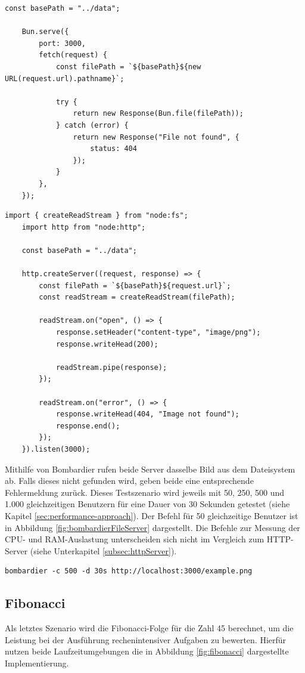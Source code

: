 \begin{lstlisting}[caption={Datei-Server Bun},label={fig:fileServerBun}]
	const basePath = "../data";
	
	Bun.serve({
		port: 3000,
		fetch(request) {
			const filePath = `${basePath}${new URL(request.url).pathname}`;
			
			try {
				return new Response(Bun.file(filePath));
			} catch (error) {
				return new Response("File not found", {
					status: 404
				});
			}
		},
	});
\end{lstlisting}

\begin{lstlisting}[caption={Datei-Server Node.js},label={fig:fileServerNode}]
	import { createReadStream } from "node:fs";
	import http from "node:http";
	
	const basePath = "../data";
	
	http.createServer((request, response) => {
		const filePath = `${basePath}${request.url}`;
		const readStream = createReadStream(filePath);
		
		readStream.on("open", () => {
			response.setHeader("content-type", "image/png");
			response.writeHead(200);
			
			readStream.pipe(response);
		});
		
		readStream.on("error", () => {
			response.writeHead(404, "Image not found");
			response.end();
		});
	}).listen(3000);
\end{lstlisting}

\noindent
Mithilfe von Bombardier rufen beide Server dasselbe Bild aus dem Dateisystem ab. Falls dieses nicht gefunden wird, geben beide eine entsprechende Fehlermeldung zurück. Dieses Testszenario wird jeweils mit 50, 250, 500 und 1.000 gleichzeitigen Benutzern für eine Dauer von 30 Sekunden getestet (siehe Kapitel \ref{sec:performance-approach}). Der Befehl für 50 gleichzeitige Benutzer ist in Abbildung \ref{fig:bombardierFileServer} dargestellt. Die Befehle zur Messung der CPU- und RAM-Auslastung unterscheiden sich nicht im Vergleich zum HTTP-Server (siehe Unterkapitel \ref{subsec:httpServer}).

\begin{lstlisting}[caption={Bombardier Datei-Server},label={fig:bombardierFileServer}]
	bombardier -c 500 -d 30s http://localhost:3000/example.png
\end{lstlisting}

\subsection{Fibonacci} \label{subsec:fibonacci}
Als letztes Szenario wird die Fibonacci-Folge für die Zahl 45 berechnet, um die Leistung bei der Ausführung rechenintensiver Aufgaben zu bewerten. Hierfür nutzen beide Laufzeitumgebungen die in Abbildung \ref{fig:fibonacci} dargestellte Implementierung.

